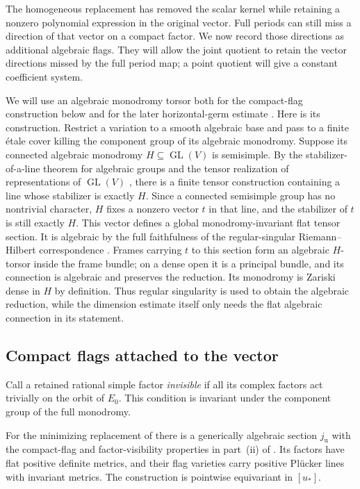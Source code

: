 The homogeneous replacement has removed the scalar kernel while retaining
a nonzero polynomial expression in the original vector. Full periods
can still miss a direction of that vector on a compact factor. We now
record those directions as additional algebraic flags. They will allow
the joint quotient to retain the vector directions missed by the full
period map; a point quotient will give a constant coefficient system.

\begin{remark}\label{rem:prelim-algebraic-monodromy-torsor}
We will use an algebraic monodromy torsor both for the compact-flag
construction below and for the later horizontal-germ estimate
. Here is its construction.
Restrict a variation to a smooth algebraic base and pass to a finite
étale cover killing the component group of its algebraic monodromy.
Suppose its connected algebraic monodromy $H\subseteq\operatorname{GL}(V)$
is semisimple.  By the stabilizer-of-a-line theorem for algebraic groups
and the tensor realization of representations of $\operatorname{GL}(V)$
\cite[Theorems 4.27 and 4.14]{Milne}, there is a finite tensor construction containing
a line whose stabilizer is exactly $H$.  Since a connected semisimple
group has no nontrivial character, $H$ fixes a nonzero vector $t$ in
that line, and the stabilizer of $t$ is still exactly $H$.  This vector
defines a global monodromy-invariant flat tensor section.  It is
algebraic by the full faithfulness of the regular-singular
Riemann--Hilbert correspondence \cite[Chapter II, \S6]{DeligneRSE}.
Frames carrying $t$ to this section form an algebraic $H$-torsor inside
the frame bundle; on a dense open it is a principal bundle, and its
connection is algebraic and preserves the reduction.  Its monodromy is
Zariski dense in $H$ by definition.  Thus regular singularity is used
to obtain the algebraic reduction, while the dimension estimate itself
only needs the flat algebraic connection in its statement.
\end{remark}


\subsection{Compact flags attached to the vector}

Call a retained rational simple factor \emph{invisible} if all its
complex factors act trivially on the orbit of $E_0$.  This condition
is invariant under the component group of the full monodromy.

\begin{lemma}\label{lem:marked-flags}
For the minimizing replacement of 
there is a generically algebraic section $j_{\mathrm u}$ with the
compact-flag and factor-visibility properties in
part~\textup{(ii)} of .
Its factors have flat positive definite metrics, and their flag
varieties carry positive Plücker lines with invariant metrics.
The construction is pointwise equivariant in $[u_*]$.
\end{lemma}

